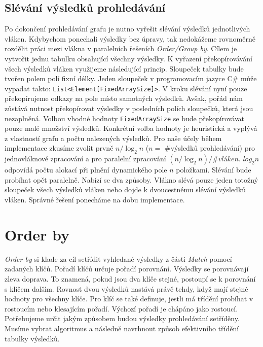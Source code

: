 \subsection{Slévání výsledků prohledávání} \label{anal.match.merge}

Po dokončení prohledávání grafu je nutno vyřešit slévání výsledků jednotlivých vláken.
Kdybychom ponechali výsledky bez úpravy, tak nedokážeme rovnoměrně rozdělit práci mezi vlákna v paralelních řešeních \textit{Order/Group by}.
Cílem je vytvořit jednu tabulku obsahující všechny výsledky.
K vyřazení překopírovávání všech výsledků vláken využijeme následující princip.
Sloupeček tabulky bude tvořen polem polí fixní délky.
Jeden sloupeček v programovacím jazyce C\# může vypadat takto: \texttt{List<Element[FixedArraySize]>}.
V kroku slévání nyní pouze překopírujeme odkazy na pole místo samotných výsledků.
Avšak, pořád nám zůstává nutnost překopírovat výsledky v posledních polích sloupečků, která jsou nezaplněná.
Volbou vhodné hodnoty \texttt{FixedArraySize} se bude překopírovávat pouze malé množství výsledků.
Konkrétní volba hodnoty je heuristická a vyplývá z vlastností grafu a počtu nalezených výsledků.
Pro naše účely během implementace zkusíme zvolit prvně $n/\log_2 n$ ($n = $ \#výsledků prohledávání) pro jednovláknové zpracování a pro paralelní zpracování $(n/\log_2 n)/\#vláken$.
$log_2 n$ odpovídá počtu alokací při plnění dynamického pole $n$ položkami.
Slévání bude probíhat opět paralelně.
Nabízí se dva způsoby.
Vlákno slévá pouze jeden totožný sloupeček všech výsledků vláken nebo dojde k dvoucestnému slévání výsledků vláken.
Správné řešení ponecháme na dobu implementace.    


\bigskip

\section{Order by} \label{anal.orderby}

\textit{Order by} si klade za cíl setřídit vyhledané výsledky z části \textit{Match} pomocí zadaných klíčů.
Pořadí klíčů určuje pořadí porovnání.
Výsledky se porovnávají zleva doprava.
To znamená, pokud jsou dva klíče stejné, postoupí se k porovnání s klíčem dalším.
Rovnost dvou výsledků nastává právě tehdy, když mají stejné hodnoty pro všechny klíče. 
Pro klíč se také definuje, jestli má třídění probíhat v rostoucím nebo klesajícím pořadí.
Výchozí pořadí je chápáno jako rostoucí. 
Potřebujeme určit jakým způsobem budou výsledky prohledávání setříděny.
Musíme vybrat algoritmus a následně navrhnout způsob efektivního třídění tabulky výsledků.

